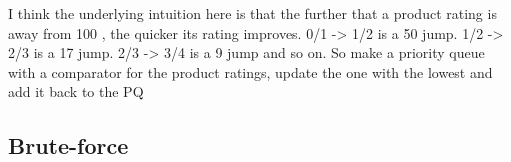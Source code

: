 I think the underlying intuition here is that the further that a product rating is away from 100%
, the quicker its rating improves. 0/1 -> 1/2 is a 50%
 jump. 1/2 -> 2/3 is a 17%
  jump. 2/3 -> 3/4 is a 9%
   jump and so on. So make a priority queue with a comparator for the product ratings, update the one with the lowest and add it back to the PQ
\subsection{Brute-force}
\label{five_starts_seller:sec:bruteforce}



